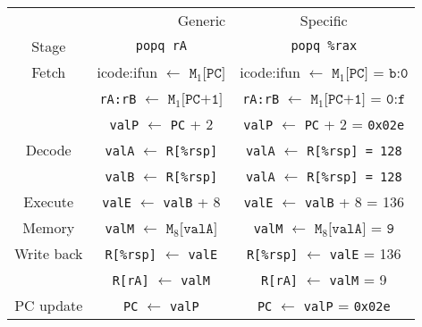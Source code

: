 \documentclass[12pt]{article}
\newenvironment{sol}[1][Solution]{\begin{trivlist}
		\item[\hskip \labelsep {\bfseries #1:}]}{\end{trivlist}}
\begin{document}
\begin{sol}
	\
	\begin{center}
		\begin{tabular}{ccc}
			\multicolumn{2}{r}{Generic} & Specific\\
			Stage & \texttt{popq rA} & \texttt{popq \%rax}\\
			\hline
			Fetch &  icode:ifun $\leftarrow$ $\texttt{M}_1\texttt{[PC]}$ & 
			icode:ifun $\leftarrow$ $\texttt{M}_1\texttt{[PC] = b:0}$ \\
			
			{} & \texttt{rA:rB} $ \leftarrow$ $\texttt{M}_1\texttt{[PC+1]}$ & 
			\texttt{rA:rB} $ \leftarrow$ $\texttt{M}_1\texttt{[PC+1] = 0:f}$\\
			{} & \texttt{valP} $ \leftarrow$ \texttt{PC} + 2 &
			\texttt{valP} $ \leftarrow$ \texttt{PC} + 2 = \texttt{0x02e}\\
			
			Decode & \texttt{valA}  $\leftarrow$ \texttt{R[\%rsp]} &
			\texttt{valA}  $\leftarrow$ \texttt{R[\%rsp] = 128}\\
			
			{} & \texttt{valB}  $\leftarrow$ \texttt{R[\%rsp]} &
			\texttt{valA}  $\leftarrow$ \texttt{R[\%rsp] = 128}\\
			
			
			Execute & \texttt{valE} $\leftarrow$  \texttt{valB} + 8 & 
			\texttt{valE} $\leftarrow$  \texttt{valB} + 8 = 136\\
			Memory & \texttt{valM} $\leftarrow$ $\texttt{M}_8\texttt{[valA]}$ &
			\texttt{valM} $\leftarrow$ $\texttt{M}_8\texttt{[valA] = 9}$\\
			
			Write back & \texttt{R[\%rsp]} $ \leftarrow$ \texttt{valE} &
			\texttt{R[\%rsp]} $ \leftarrow$ \texttt{valE} = 136\\
			{} & \texttt{R[rA]} $\leftarrow$ \texttt{valM}&
			\texttt{R[rA]} $\leftarrow$ \texttt{valM} = 9\\
			
			PC update & \texttt{PC} $\leftarrow$ \texttt{valP} &
			 \texttt{PC} $\leftarrow$ \texttt{valP} = \texttt{0x02e}\\
		\end{tabular}
	\end{center}
\end{sol}
\end{document}
